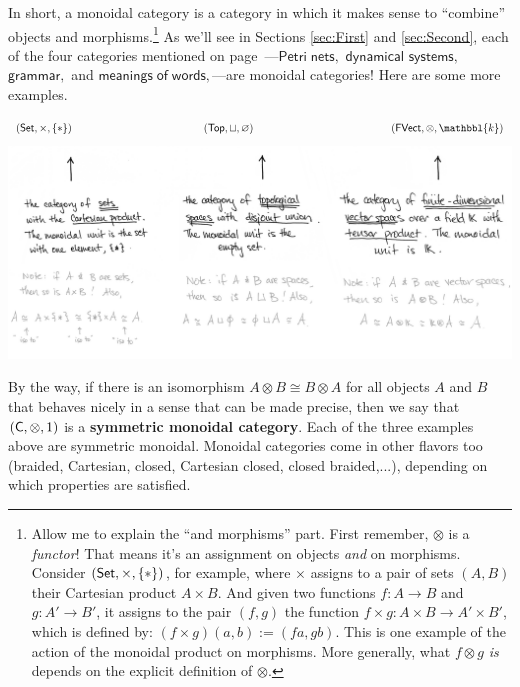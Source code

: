 \documentclass{tufte-handout-tai}
\newcommand{\cat}[1]{{\normalfont\textsf{#1}}}
\theoremstyle{plain}
\theoremstyle{definition}
\theoremstyle{remark}
\begin{document}
In short, a monoidal category is a category in which it makes sense to ``combine'' objects and morphisms.\footnote[][10.6cm]{Allow me to explain the ``and morphisms'' part. First remember, $\otimes$ is a \textit{functor}! That means it's an assignment on objects \textit{and} on morphisms. Consider $(\cat{Set},\times,\{\ast\})$, for example, where $\times$ assigns to a pair of sets $(A,B)$ their Cartesian product $A\times B$. And given two functions $f\colon A\to B$ and $g\colon A'\to B'$, it assigns to the pair $(f,g)$ the function $f\times g\colon A\times B\to A'\times B'$, which is defined by: $(f\times g)(a,b):=(fa,gb)$. This is one example of the action of the monoidal product on morphisms. More generally, what $f\otimes g$ \textit{is} depends on the explicit definition of $\otimes$.} As we'll see in Sections \ref{sec:First} and \ref{sec:Second}, each of the four categories mentioned on page~\pageref{fig:4cats}---$\mathsf{Petri\;nets},$ $\mathsf{dynamical}$ $\mathsf{systems},$ $\mathsf{grammar},$ and $\mathsf{meanings\;of\;words},$---are monoidal categories! Here are some more examples.
\begin{fullwidth}
\[(\cat{Set},\times,\{\ast\}) \hspace{4.4cm} (\cat{Top},\sqcup,\varnothing) \hspace{4.6cm} (\cat{FVect},\otimes,\mathbbl{k})\]
\includegraphics{monoids2.jpg}
\end{fullwidth}

By the way, if there is an isomorphism $A\otimes B\cong B\otimes A$ for all objects $A$ and $B$ that behaves nicely in a sense that can be made precise, then we say that $(\cat{C},\otimes,1)$ is a \textbf{symmetric monoidal category}. Each of the three examples above are symmetric monoidal. Monoidal categories come in other flavors too (braided, Cartesian, closed, Cartesian closed, closed braided,...), depending on which properties are satisfied.
\end{document}
